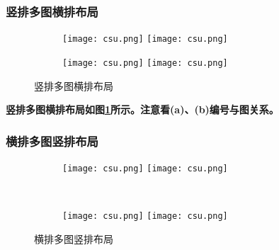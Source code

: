 \subsubsection{竖排多图横排布局}

\begin{figure}[!htb]
    \centering
    \begin{subfigure}[t]{0.13\linewidth}
        \begin{minipage}[b]{1\linewidth}
        \texttt{[image: csu.png]} \vspace{-1ex} \vfill
        \texttt{[image: csu.png]}
         \caption{}
        \end{minipage}
    \end{subfigure}
    \begin{subfigure}[t]{0.13\linewidth}
        \begin{minipage}[b]{1\linewidth}
        \texttt{[image: csu.png]} \vspace{-1ex} \vfill
        \texttt{[image: csu.png]}
        \caption{}
        \end{minipage}
    \end{subfigure}
    \caption{竖排多图横排布局}
    \label{F.csu_col_row}
\end{figure}

\textbf{竖排多图横排布局如图\ref{F.csu_col_row}所示。注意看(a)、(b)编号与图关系。}


\subsubsection{横排多图竖排布局}



\begin{figure}[!htb]
    \centering
    \begin{subfigure}[t]{0.3\linewidth}
        \begin{minipage}[b]{1\linewidth}
        \texttt{[image: csu.png]}
        \texttt{[image: csu.png]}
        \caption{}
        \end{minipage}
    \end{subfigure}\\
    \begin{subfigure}[t]{0.3\linewidth}
        \begin{minipage}[b]{1\linewidth}
        \texttt{[image: csu.png]}
        \texttt{[image: csu.png]}
        \caption{}
        \end{minipage}
    \end{subfigure}
    \caption{横排多图竖排布局}
    \label{F.csu_row_col}
\end{figure}

